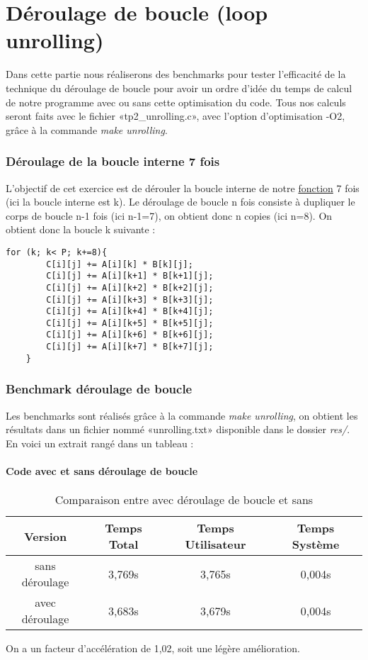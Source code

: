 \documentclass{rapport}
\begin{document}
  \clearpage
  \part{Déroulage de boucle (loop unrolling)}
  
    Dans cette partie nous réaliserons des benchmarks pour tester l'efficacité de la technique du déroulage de boucle pour avoir un ordre d'idée du temps de calcul de notre programme avec ou sans cette optimisation du code. Tous nos calculs seront faits avec le fichier «tp2\_unrolling.c», avec l'option d'optimisation -O2, grâce à la commande \textit{make unrolling}.
    
    \section{Déroulage de la boucle interne 7 fois}
        L'objectif de cet exercice est de dérouler la boucle interne de notre \hyperref[algo:algo]{fonction} 7 fois (ici la boucle interne est k). Le déroulage de boucle n fois consiste à dupliquer le corps de boucle n-1 fois (ici n-1=7), on obtient donc n copies (ici n=8).
        \newline
        On obtient donc la boucle k suivante :
    \begin{lstlisting}
for (k; k< P; k+=8){
        C[i][j] += A[i][k] * B[k][j];
        C[i][j] += A[i][k+1] * B[k+1][j];
        C[i][j] += A[i][k+2] * B[k+2][j];
        C[i][j] += A[i][k+3] * B[k+3][j];
        C[i][j] += A[i][k+4] * B[k+4][j];
        C[i][j] += A[i][k+5] * B[k+5][j];
        C[i][j] += A[i][k+6] * B[k+6][j];
        C[i][j] += A[i][k+7] * B[k+7][j];
    }
    \end{lstlisting}
    
    \section{Benchmark déroulage de boucle}
      Les benchmarks sont réalisés grâce à la commande \textit{make unrolling}, on obtient les résultats dans un fichier nommé «unrolling.txt» disponible dans le dossier \textit{res/}. En voici un extrait rangé dans un tableau :
    \subsection{Code avec et sans déroulage de boucle}
      \begin{table}[h!]
    \centering
    \begin{tabular}{|c|c|c|c|}
        \hline
        Version & Temps Total & Temps Utilisateur & Temps Système \\
        \hline
        sans déroulage & 3,769s & 3,765s & 0,004s \\
        \hline
        avec déroulage & 3,683s &3,679s  & 0,004s \\
        \hline
    \end{tabular}
    \caption{Comparaison entre avec déroulage de boucle et sans}
\end{table}
      On a un facteur d'accélération de 1,02, soit une légère amélioration.
\end{document}
